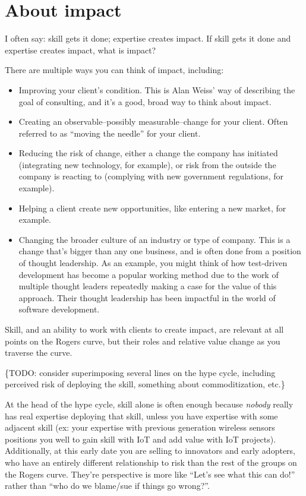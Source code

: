 \section{About impact}

I often say: skill gets it done; expertise creates impact. If skill gets it done and expertise creates impact, what is impact?

There are multiple ways you can think of impact, including:

\begin{itemize}
\item Improving your client's condition. This is Alan Weiss' way of describing the goal of consulting, and it's a good, broad way to think about impact.
\item Creating an observable--possibly measurable--change for your client. Often referred to as ``moving the needle'' for your client.
\item Reducing the risk of change, either a change the company has initiated (integrating new technology, for example), or risk from the outside the company is reacting to (complying with new government regulations, for example).
\item Helping a client create new opportunities, like entering a new market, for example.
\item Changing the broader culture of an industry or type of company. This is a change that's bigger than any one business, and is often done from a position of thought leadership. As an example, you might think of how test-driven development has become a popular working method due to the work of multiple thought leaders repeatedly making a case for the value of this approach. Their thought leadership has been impactful in the world of software development.
\end{itemize}

Skill, and an ability to work with clients to create impact, are relevant at all points on the Rogers curve, but their roles and relative value change as you traverse the curve.

\{TODO: consider superimposing several lines on the hype cycle, including perceived risk of deploying the skill, something about commoditization, etc.\}

At the head of the hype cycle, skill alone is often enough because \emph{nobody} really has real expertise deploying that skill, unless you have expertise with some adjacent skill (ex: your expertise with previous generation wireless sensors positions you well to gain skill with IoT and add value with IoT projects). Additionally, at this early date you are selling to innovators and early adopters, who have an entirely different relationship to risk than the rest of the groups on the Rogers curve. They're perspective is more like ``Let's see what this can do!'' rather than ``who do we blame/sue if things go wrong?''.

